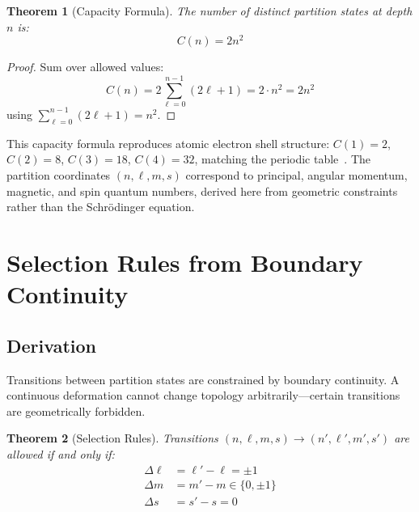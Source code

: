 \documentclass[twocolumn,aps,prb,superscriptaddress,longbibliography,floatfix]{revtex4-2}
\newtheorem{theorem}{Theorem}[section]
\theoremstyle{remark}
\begin{document}
\begin{theorem}[Capacity Formula]
\label{thm:capacity}
The number of distinct partition states at depth $n$ is:
\begin{equation}
C(n) = 2n^2
\label{eq:capacity}
\end{equation}
\end{theorem}

\begin{proof}
Sum over allowed values:
\begin{equation}
C(n) = 2 \sum_{\ell=0}^{n-1} (2\ell + 1) = 2 \cdot n^2 = 2n^2
\end{equation}
using $\sum_{\ell=0}^{n-1}(2\ell+1) = n^2$.
\end{proof}

This capacity formula reproduces atomic electron shell structure:
$C(1) = 2$, $C(2) = 8$, $C(3) = 18$, $C(4) = 32$, matching the periodic
table~\cite{Pauling1960}. The partition coordinates $(n, \ell, m, s)$
correspond to principal, angular momentum, magnetic, and spin quantum
numbers, derived here from geometric constraints rather than the
Schr\"{o}dinger equation.

\section{Selection Rules from Boundary Continuity}
\label{sec:selection}

\subsection{Derivation}

Transitions between partition states are constrained by boundary
continuity. A continuous deformation cannot change topology
arbitrarily---certain transitions are geometrically forbidden.

\begin{theorem}[Selection Rules]
\label{thm:selection}
Transitions $(n, \ell, m, s) \to (n', \ell', m', s')$ are allowed if and
only if:
\begin{align}
\Delta \ell &= \ell' - \ell = \pm 1 \label{eq:sel_l} \\
\Delta m &= m' - m \in \{0, \pm 1\} \label{eq:sel_m} \\
\Delta s &= s' - s = 0 \label{eq:sel_s}
\end{align}
\end{theorem}
\end{document}

